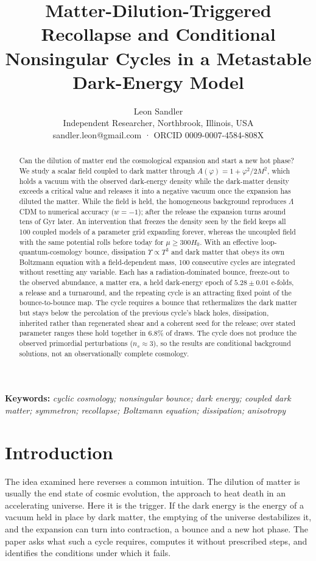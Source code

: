 \documentclass[11pt,a4paper]{article}
\title{Matter-Dilution-Triggered Recollapse and Conditional Nonsingular Cycles in a Metastable Dark-Energy Model}
\author{Leon Sandler \\ Independent Researcher, Northbrook, Illinois, USA \\ sandler.leon@gmail.com   ·   ORCID 0009-0007-4584-808X}
\date{}
\begin{document}
\maketitle

\begin{abstract}
Can the dilution of matter end the cosmological expansion and start a new hot phase? We study a scalar field coupled to dark matter through $A(\varphi)=1+\varphi^2/2M^2$, which holds a vacuum with the observed dark-energy density while the dark-matter density exceeds a critical value and releases it into a negative vacuum once the expansion has diluted the matter. While the field is held, the homogeneous background reproduces $\Lambda$CDM to numerical accuracy ($w=-1$); after the release the expansion turns around tens of Gyr later. An intervention that freezes the density seen by the field keeps all 100 coupled models of a parameter grid expanding forever, whereas the uncoupled field with the same potential rolls before today for $\mu\ge300H_0$. With an effective loop-quantum-cosmology bounce, dissipation $\Upsilon\propto T^3$ and dark matter that obeys its own Boltzmann equation with a field-dependent mass, 100 consecutive cycles are integrated without resetting any variable. Each has a radiation-dominated bounce, freeze-out to the observed abundance, a matter era, a held dark-energy epoch of $5.28\pm0.01$ e-folds, a release and a turnaround, and the repeating cycle is an attracting fixed point of the bounce-to-bounce map. The cycle requires a bounce that rethermalizes the dark matter but stays below the percolation of the previous cycle's black holes, dissipation, inherited rather than regenerated shear and a coherent seed for the release; over stated parameter ranges these hold together in 6.8\% of draws. The cycle does not produce the observed primordial perturbations ($n_s\approx3$), so the results are conditional background solutions, not an observationally complete cosmology.
\end{abstract}
\noindent\textbf{Keywords:} \emph{cyclic cosmology; nonsingular bounce; dark energy; coupled dark matter; symmetron; recollapse; Boltzmann equation; dissipation; anisotropy}

\section{Introduction}
The idea examined here reverses a common intuition. The dilution of matter is usually the end state of cosmic evolution, the approach to heat death in an accelerating universe. Here it is the trigger. If the dark energy is the energy of a vacuum held in place by dark matter, the emptying of the universe destabilizes it, and the expansion can turn into contraction, a bounce and a new hot phase. The paper asks what such a cycle requires, computes it without prescribed steps, and identifies the conditions under which it fails.
\end{document}
